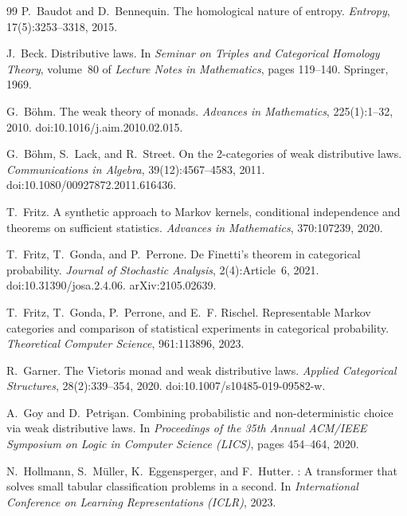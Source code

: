 \documentclass[11pt]{article}
\theoremstyle{definition}
\theoremstyle{remark}
\begin{document}
\begin{thebibliography}{99}
P.~Baudot and D.~Bennequin.
\newblock The homological nature of entropy.
\newblock \emph{Entropy}, 17(5):3253--3318, 2015.

J.~Beck.
\newblock Distributive laws.
\newblock In \emph{Seminar on Triples and Categorical Homology Theory}, volume~80 of \emph{Lecture
  Notes in Mathematics}, pages 119--140. Springer, 1969.

G.~B\"ohm.
\newblock The weak theory of monads.
\newblock \emph{Advances in Mathematics}, 225(1):1--32, 2010.
\newblock doi:10.1016/j.aim.2010.02.015.

G.~B\"ohm, S.~Lack, and R.~Street.
\newblock On the 2-categories of weak distributive laws.
\newblock \emph{Communications in Algebra}, 39(12):4567--4583, 2011.
\newblock doi:10.1080/00927872.2011.616436.

T.~Fritz.
\newblock A synthetic approach to {M}arkov kernels, conditional independence and theorems on
  sufficient statistics.
\newblock \emph{Advances in Mathematics}, 370:107239, 2020.

T.~Fritz, T.~Gonda, and P.~Perrone.
\newblock De {F}inetti's theorem in categorical probability.
\newblock \emph{Journal of Stochastic Analysis}, 2(4):Article~6, 2021.
\newblock doi:10.31390/josa.2.4.06. arXiv:2105.02639.

T.~Fritz, T.~Gonda, P.~Perrone, and E.~F. Rischel.
\newblock Representable {M}arkov categories and comparison of statistical experiments in categorical
  probability.
\newblock \emph{Theoretical Computer Science}, 961:113896, 2023.

R.~Garner.
\newblock The {V}ietoris monad and weak distributive laws.
\newblock \emph{Applied Categorical Structures}, 28(2):339--354, 2020.
\newblock doi:10.1007/s10485-019-09582-w.

A.~Goy and D.~Petri\c{s}an.
\newblock Combining probabilistic and non-deterministic choice via weak distributive laws.
\newblock In \emph{Proceedings of the 35th Annual ACM/IEEE Symposium on Logic in Computer Science
  (LICS)}, pages 454--464, 2020.

N.~Hollmann, S.~M\"uller, K.~Eggensperger, and F.~Hutter.
: A transformer that solves small tabular classification problems in a second.
\newblock In \emph{International Conference on Learning Representations (ICLR)}, 2023.


\end{thebibliography}
\end{document}
